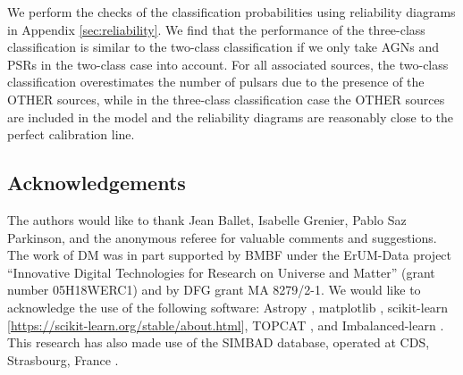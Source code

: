 \documentclass[referee]{aa} %
\begin{document}
We perform the checks of the classification probabilities using reliability diagrams in Appendix \ref{sec:reliability}. 
We find that the performance of the three-class classification is similar to the two-class classification if we only take AGNs and PSRs in the two-class case into account. For all associated sources, the two-class classification overestimates the number of pulsars due to the presence of the
OTHER sources, while in the three-class classification case the OTHER sources are included in the model and the reliability diagrams are reasonably close to the perfect calibration line.

\subsection*{Acknowledgements}

The authors would like to thank Jean Ballet, Isabelle Grenier, Pablo Saz Parkinson, and the anonymous referee for valuable comments and suggestions.
The work of DM was in part supported by BMBF under the ErUM-Data project ``Innovative Digital Technologies for Research on Universe and Matter'' (grant number 05H18WERC1) and by DFG grant MA 8279/2-1.
We would like to acknowledge the use of the following software:
Astropy \citep[\url{http://www.astropy.org},][]{2013A&A...558A..33A}, 
matplotlib \citep{Hunter:2007}, 
scikit-learn [\url{https://scikit-learn.org/stable/about.html}], 
TOPCAT \citep{2005ASPC..347...29T}, and Imbalanced-learn \cite{JMLR:v18:16-365}.
This research has also made use of the SIMBAD database,
operated at CDS, Strasbourg, France \citep{2000A&AS..143....9W}.

  
\end{document}
